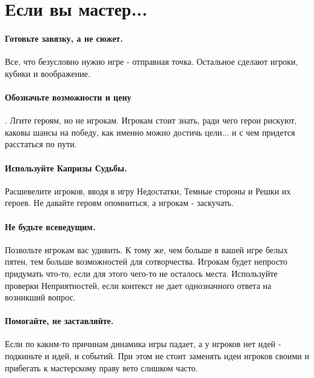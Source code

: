 \section*{Если вы мастер...}

\paragraph{Готовьте завязку, а не сюжет.} Все, что безусловно нужно игре - отправная точка. Остальное сделают игроки, кубики и воображение.
\paragraph{Обозначьте возможности и цену}. Лгите героям, но не игрокам. Игрокам стоит знать, ради чего герои рискуют, каковы шансы на победу, как именно можно достичь цели... и с чем придется расстаться по пути.
\paragraph{Используйте Капризы Судьбы.} Расшевелите игроков, вводя в игру Недостатки, Темные стороны и Решки их героев. Не давайте героям опомниться, а игрокам - заскучать.
\paragraph{Не будьте всеведущим.} Позвольте игрокам вас удивить. К тому же, чем больше в вашей игре белых пятен, тем больше возможностей для сотворчества. Игрокам будет непросто придумать что-то, если для этого чего-то не осталось места. Используйте проверки Неприятностей, если контекст не дает однозначного ответа на возникший вопрос.
\paragraph{Помогайте, не заставляйте.} Если по каким-то причинам динамика игры падает, а у игроков нет идей - подкиньте и идей, и событий. При этом не стоит заменять идеи игроков своими и прибегать к мастерскому праву вето слишком часто.